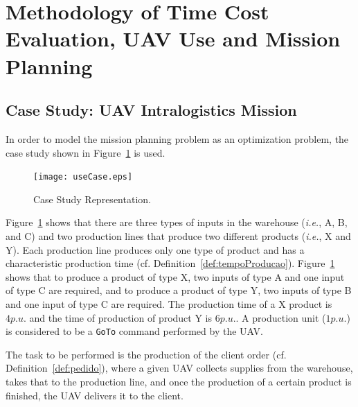 \documentclass[conference]{IEEEtran}
\newcommand{\commentib}[1]{{\color{blue} [IB: #1]}}
\begin{document}


\section{Methodology of Time Cost Evaluation, UAV Use and Mission Planning}
\label{sec:method}



\subsection{Case Study: UAV Intralogistics Mission}
\label{sec:ec}

In order to model the mission planning problem as an optimization problem, the case study shown in Figure~\ref{fig:useCase} is used.
%
\begin{figure}[ht]
	\centering
	\texttt{[image: useCase.eps]}
	\caption{Case Study Representation.\label{fig:useCase}}
\end{figure}
	
Figure~\ref{fig:useCase} shows that there are three types of inputs in the warehouse (\textit{i.e.}, A, B, and C) and two production lines that produce two different products (\textit{i.e.}, X and Y). Each production line produces only one type of product and has a characteristic production time (cf. Definition~\ref{def:tempoProducao}). Figure~\ref{fig:useCase} shows that to produce a product of type X, two inputs of type A and one input of type C are required, and to produce a product of type Y, two inputs of type B and one input of type C are required. The production time of a X product is $4 p.u.$ and the time of production of product Y is $6 p.u.$. A production unit ($1 p.u.$) is considered to be a \texttt{GoTo} command performed by the UAV.

The task to be performed is the production of the client order (cf. Definition~\ref{def:pedido}), where a given UAV collects supplies from the warehouse, takes that to the production line, and once the production of a certain product is finished, the UAV delivers it to the client.
\end{document}
